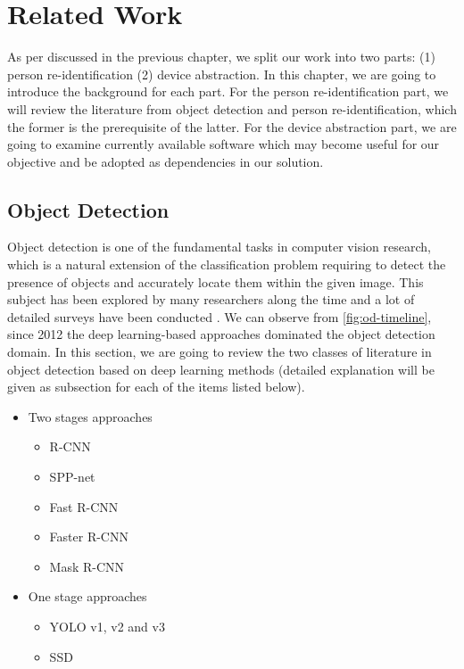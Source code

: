 \chapter{Related Work}
\label{chap:RelatedWork}


As per discussed in the previous chapter, we split our work into two parts:
(1) person re-identification (2) device abstraction.
In this chapter, we are going to introduce the background for each part. For the
person re-identification part, we will review the literature from object
detection and person re-identification, which the former is the prerequisite of
the latter. For the device abstraction part, we are going to examine currently
available software which may become useful for our objective and be adopted as
dependencies in our solution.


\section{Object Detection}
\label{sec:related_work_obj_det}

Object detection is one of the fundamental tasks in computer vision research,
which is a natural extension of the classification problem requiring to detect 
the presence of objects and accurately locate them within the given image.
This subject has been explored by many researchers along the time and a lot of
detailed surveys have been conducted 
\cite{survey1-on-dl-od-2018, survey2-on-dl-od-2018}.
We can observe from \autoref{fig:od-timeline}, since 2012 the deep
learning-based approaches dominated the object detection domain.
In this section, we are going to review the two classes of literature in object
detection based on deep learning methods (detailed explanation will be given as
subsection for each of the items listed below).

\begin{itemize}
    \item Two stages approaches
    \begin{itemize}
        \item R-CNN
        \item SPP-net
        \item Fast R-CNN
        \item Faster R-CNN
        \item Mask R-CNN
    \end{itemize}

    \item One stage approaches
    \begin{itemize}
        \item YOLO v1, v2 and v3
        \item SSD
    \end{itemize}
\end{itemize}

